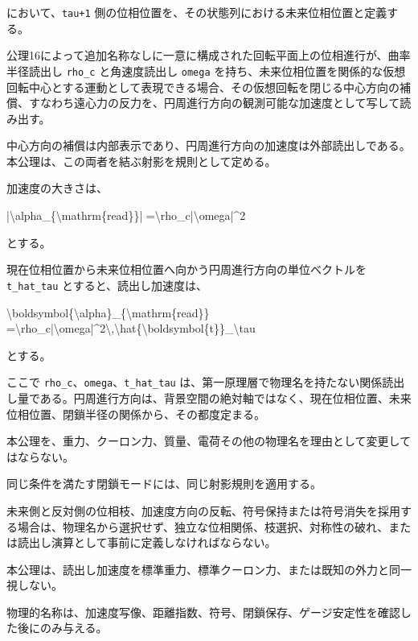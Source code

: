 \documentclass[
  a4paper,
]{ltjsarticle}
\newenvironment{Shaded}{}{}
\newcommand{\NormalTok}[1]{#1}
\begin{document}
において、\texttt{tau+1}
側の位相位置を、その状態列における未来位相位置と定義する。

公理16によって追加名称なしに一意に構成された回転平面上の位相進行が、曲率半径読出し
\texttt{rho\_c} と角速度読出し \texttt{omega}
を持ち、未来位相位置を関係的な仮想回転中心とする運動として表現できる場合、その仮想回転を閉じる中心方向の補償、すなわち遠心力の反力を、円周進行方向の観測可能な加速度として写して読み出す。

中心方向の補償は内部表示であり、円周進行方向の加速度は外部読出しである。本公理は、この両者を結ぶ射影を規則として定める。

加速度の大きさは、

\begin{Shaded}
\begin{Highlighting}[]
\NormalTok{|\textbackslash{}alpha\_\{\textbackslash{}mathrm\{read\}\}|}
\NormalTok{=\textbackslash{}rho\_c|\textbackslash{}omega|\^{}2}
\end{Highlighting}
\end{Shaded}

とする。

現在位相位置から未来位相位置へ向かう円周進行方向の単位ベクトルを
\texttt{t\_hat\_tau} とすると、読出し加速度は、

\begin{Shaded}
\begin{Highlighting}[]
\NormalTok{\textbackslash{}boldsymbol\{\textbackslash{}alpha\}\_\{\textbackslash{}mathrm\{read\}\}}
\NormalTok{=\textbackslash{}rho\_c|\textbackslash{}omega|\^{}2\textbackslash{},\textbackslash{}hat\{\textbackslash{}boldsymbol\{t\}\}\_\textbackslash{}tau}
\end{Highlighting}
\end{Shaded}

とする。

ここで \texttt{rho\_c}、\texttt{omega}、\texttt{t\_hat\_tau}
は、第一原理層で物理名を持たない関係読出し量である。円周進行方向は、背景空間の絶対軸ではなく、現在位相位置、未来位相位置、閉鎖半径の関係から、その都度定まる。

本公理を、重力、クーロン力、質量、電荷その他の物理名を理由として変更してはならない。

同じ条件を満たす閉鎖モードには、同じ射影規則を適用する。

未来側と反対側の位相枝、加速度方向の反転、符号保持または符号消失を採用する場合は、物理名から選択せず、独立な位相関係、枝選択、対称性の破れ、または読出し演算として事前に定義しなければならない。

本公理は、読出し加速度を標準重力、標準クーロン力、または既知の外力と同一視しない。

物理的名称は、加速度写像、距離指数、符号、閉鎖保存、ゲージ安定性を確認した後にのみ与える。
\end{document}
